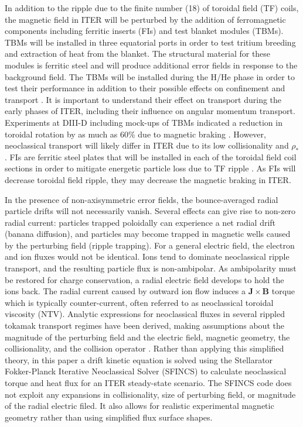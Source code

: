\documentclass{article}
\begin{document}
In addition to the ripple due to the finite number (18) of toroidal field (TF) coils, the magnetic field in ITER will be perturbed by the addition of ferromagnetic components including ferritic inserts (FIs) and test blanket modules (TBMs). TBMs will be installed in three equatorial ports in order to test tritium breeding and extraction of heat from the blanket. The structural material for these modules is ferritic steel and will produce additional error fields in response to the background field. The TBMs will be installed during the H/He phase in order to test their performance in addition to their possible effects on confinement and transport \cite{Chuyanov2010}. It is important to understand their effect on transport during the early phases of ITER, including their influence on angular momentum transport. Experiments at DIII-D including mock-ups of TBMs indicated a reduction in toroidal rotation by as much as 60\% due to magnetic braking \cite{Schaffer2011}. However, neoclassical transport will likely differ in ITER due to its low collisionality and $\rho_*$. FIs are ferritic steel plates that will be installed in each of the toroidal field coil sections in order to mitigate energetic particle loss due to TF ripple \cite{Tobita2003}. As FIs will decrease toroidal field ripple, they may decrease the magnetic braking in ITER. 

In the presence of non-axisymmetric error fields, the bounce-averaged radial particle drifts will not necessarily vanish. Several effects can give rise to non-zero radial current: particles trapped poloidally can experience a net radial drift (banana diffusion), and particles may become trapped in magnetic wells caused by the perturbing field (ripple trapping). For a general electric field, the electron and ion fluxes would not be identical. Ions tend to dominate neoclassical ripple transport, and the resulting particle flux is non-ambipolar. As ambipolarity must be restored for charge conservation, a radial electric field develops to hold the ions back. The radial current caused by outward ion flow induces a $\bm{J} \times \bm{B}$ torque which is typically counter-current, often referred to as neoclassical toroidal viscosity (NTV). Analytic expressions for neoclassical fluxes in several rippled tokamak transport regimes have been derived, making assumptions about the magnitude of the perturbing field and the electric field, magnetic geometry, the collisionality, and the collision operator \cite{Shaing2003, Shaing2008, Shaing2010}. Rather than applying this simplified theory, in this paper a drift kinetic equation is solved using the Stellarator Fokker-Planck Iterative Neoclassical Solver (SFINCS) \cite{Landreman2014} to calculate neoclassical torque and heat flux for an ITER steady-state scenario. The SFINCS code does not exploit any expansions in collisionality, size of perturbing field, or magnitude of the radial electric filed. It also allows for realistic experimental magnetic geometry rather than using simplified flux surface shapes. 
\end{document}
